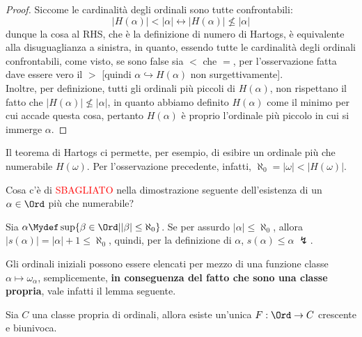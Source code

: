 \documentclass[11pt]{scrartcl}
\begin{document}
\begin{proof}
	Siccome le cardinalità degli ordinali sono tutte confrontabili:
	\[ |H(\alpha)| < |\alpha| \leftrightarrow |H(\alpha)| \not\leq |\alpha|
		\]
	dunque la cosa al RHS, che è la definizione di numero di Hartogs, è equivalente alla disuguaglianza a sinistra, in quanto, essendo tutte le cardinalità degli ordinali confrontabili, come visto,
	se sono false sia $<$ che $=$, per l'osservazione fatta dave essere vero il $>$ [quindi $\alpha \hookrightarrow H(\alpha)$ non surgettivamente].\\
	Inoltre, per definizione, tutti gli ordinali più piccoli di $H(\alpha)$, non rispettano il fatto che $|H(\alpha)| \not\leq |\alpha|$, in quanto abbiamo definito $H(\alpha)$ come il minimo per cui accade questa cosa, pertanto $H(\alpha)$ è proprio l'ordinale più piccolo in cui si immerge $\alpha$.
\end{proof}

Il teorema di Hartogs ci permette, per esempio, di esibire un ordinale più che numerabile $H(\omega)$. Per l'osservazione precedente, infatti, $\aleph_0 = |\omega| < |H(\omega)|$.

\begin{exercise}
	Cosa c'è di \textcolor{red}{SBAGLIATO} nella dimostrazione seguente dell'esistenza di un $\alpha \in \Ord$ più che numerabile?
\end{exercise}

Sia $\alpha \Mydef \sup\{\beta \in \Ord | |\beta| \leq \aleph_0\}$. Se per assurdo $|\alpha| \leq \aleph_0$, allora $|s(\alpha)| = |\alpha| + 1 \leq \aleph_0$, quindi, per la definizione di $\alpha$, $s(\alpha) \leq \alpha \;\lightning$.

\begin{soln}
	
\end{soln}

Gli ordinali iniziali possono essere elencati per mezzo di una funzione classe $\alpha \mapsto \omega_\alpha$, semplicemente, \textbf{in conseguenza del fatto che sono una classe propria}, vale infatti il lemma seguente.

\begin{lemma}
	Sia $C$ una classe propria di ordinali, allora esiste un'unica $F : \Ord \rightarrow C$ crescente e biunivoca.
\end{lemma}
\end{document}
